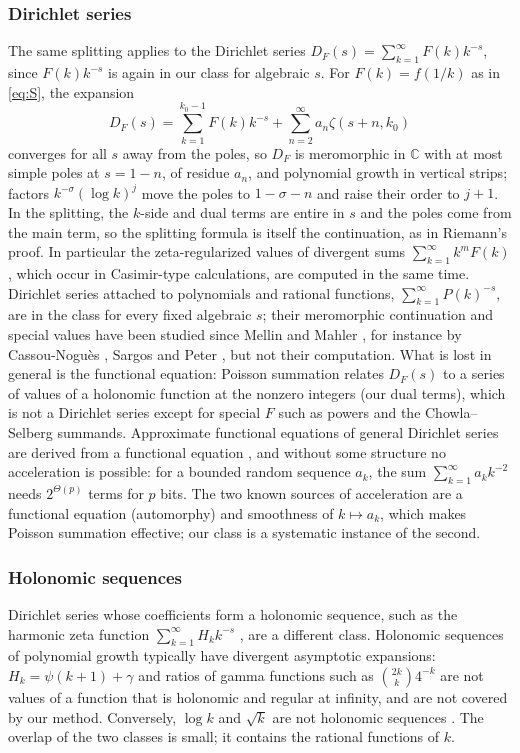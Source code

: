 \documentclass[11pt]{amsart}
\theoremstyle{definition}
\theoremstyle{remark}
\newcommand{\CC}{\mathbb{C}}
\begin{document}
\subsubsection{Dirichlet series}
The same splitting applies to the Dirichlet series $D_F(s) = \sum_{k=1}^{\infty}F(k)k^{-s}$, since $F(k)k^{-s}$ is again
in our class for algebraic $s$. For $F(k) = f(1/k)$ as in \eqref{eq:S}, the expansion
\[
  D_F(s) = \sum_{k=1}^{k_0-1}F(k)k^{-s} + \sum_{n=2}^{\infty}a_n\zeta(s+n, k_0)
\]
converges for all $s$ away from the poles, so $D_F$ is meromorphic in $\CC$ with at most simple poles at $s = 1-n$, of residue $a_n$, and polynomial growth in vertical
strips; factors $k^{-\sigma}(\log k)^j$ move the poles to $1 - \sigma - n$ and raise their order to $j+1$. In the
splitting, the $k$-side and dual terms are entire in $s$ and the poles come from the main term, so the splitting
formula is itself the continuation, as in Riemann's proof. In particular the zeta-regularized values of divergent
sums $\sum_{k=1}^{\infty} k^mF(k)$, which occur in Casimir-type calculations, are computed in the same time. Dirichlet series
attached to polynomials and rational functions, $\sum_{k=1}^{\infty} P(k)^{-s}$, are in the class for every fixed algebraic $s$;
their meromorphic continuation and special values have been studied since Mellin and Mahler \cite{Mah28}, for instance
by Cassou-Nogu\`es \cite{CN81}, Sargos \cite{Sar84} and Peter \cite{Pet98}, but not their computation. What is lost in
general is the functional equation: Poisson summation relates $D_F(s)$ to a series of values of a holonomic function
at the nonzero integers (our dual terms), which is not a Dirichlet series except for special $F$ such as powers
and the Chowla--Selberg summands. Approximate functional equations of general Dirichlet series are derived from
a functional equation \cite{Lav68,CN62}, and without some structure no acceleration is possible: for a bounded random
sequence $a_k$, the sum $\sum_{k=1}^{\infty}a_kk^{-2}$ needs $2^{\Theta(p)}$ terms for $p$ bits. The two known sources of
acceleration are a functional equation (automorphy) and smoothness of $k \mapsto a_k$, which makes Poisson summation
effective; our class is a systematic instance of the second.

\subsubsection{Holonomic sequences}
Dirichlet series whose coefficients form a holonomic sequence, such as the harmonic zeta function
$\sum_{k=1}^{\infty} H_kk^{-s}$ \cite{AV84,CC20}, are a different class. Holonomic sequences of polynomial growth typically have
divergent asymptotic expansions: $H_k = \psi(k+1)+\gamma$ and ratios of gamma functions such as $\binom{2k}{k}4^{-k}$
are not values of a function that is holonomic and regular at infinity, and are not covered by our method.
Conversely, $\log k$ and $\sqrt k$ are not holonomic sequences \cite{FGS05}. The overlap of the two classes is
small; it contains the rational functions of $k$.
\end{document}
